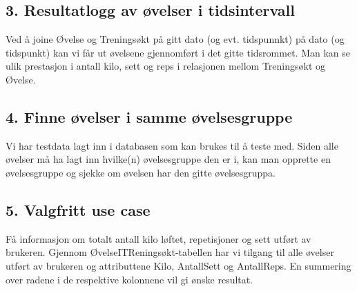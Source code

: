 \documentclass[11pt]{article}
\begin{document}
\subsection*{3. Resultatlogg av øvelser i tidsintervall}
\label{sec:org3eb238c}
Ved å joine Øvelse og Treningsøkt på gitt dato (og evt. tidspunnkt) på dato (og tidspunkt) kan vi får ut øvelsene gjennomført i det gitte tidsrommet. Man kan se ulik prestasjon i antall kilo, sett og reps i relasjonen mellom Treningsøkt og Øvelse.\\
\subsection*{4. Finne øvelser i samme øvelsesgruppe}
\label{sec:org4e14568}
Vi har testdata lagt inn i databasen som kan brukes til å teste med. Siden alle øvelser må ha lagt inn hvilke(n) øvelsesgruppe den er i, kan man opprette en øvelsesgruppe og sjekke om øvelsen har den gitte øvelsesgruppa.\\
\subsection*{5. Valgfritt use case}
\label{sec:org718b0e5}
Få informasjon om totalt antall kilo løftet, repetisjoner og sett utført av brukeren. Gjennom ØvelseITReningsøkt-tabellen har vi tilgang til alle øvelser utført av brukeren og attributtene Kilo, AntallSett og AntallReps. En summering over radene i de respektive kolonnene vil gi ønske resultat.\\
\end{document}
